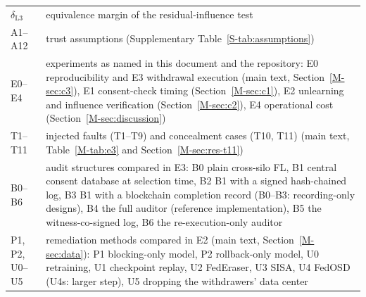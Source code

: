 \begin{table}[h]
{\begin{tabular}{@{}l p{}@{}}
$\delta_{\mathrm{L3}}$ & equivalence margin of the residual-influence test \\
A1--A12 & trust assumptions (Supplementary Table~\ref{S-tab:assumptions}) \\
E0--E4 & experiments as named in this document and the repository: E0 reproducibility and E3 withdrawal execution (main text, Section~\ref{M-sec:c3}), E1 consent-check timing (Section~\ref{M-sec:c1}), E2 unlearning and influence verification (Section~\ref{M-sec:c2}), E4 operational cost (Section~\ref{M-sec:discussion}) \\
T1--T11 & injected faults (T1--T9) and concealment cases (T10, T11) (main text, Table~\ref{M-tab:e3} and Section~\ref{M-sec:res-t11}) \\
B0--B6 & audit structures compared in E3: B0 plain cross-silo FL, B1 central consent database at selection time, B2 B1 with a signed hash-chained log, B3 B1 with a blockchain completion record (B0--B3: recording-only designs), B4 the full auditor (reference implementation), B5 the witness-co-signed log, B6 the re-execution-only auditor \\
P1, P2, U0--U5 & remediation methods compared in E2 (main text, Section~\ref{M-sec:data}): P1 blocking-only model, P2 rollback-only model, U0 retraining, U1 checkpoint replay, U2 FedEraser, U3 SISA, U4 FedOSD (U4s: larger step), U5 dropping the withdrawers' data center \\
\bottomrule
\end{tabular}}
\end{table}
